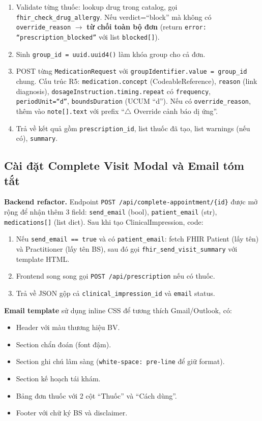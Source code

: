 \documentclass[a4paper,13pt,3p,twoside,openany]{report}
\theoremstyle{definition}
\theoremstyle{remark}
\theoremstyle{definition}
\let\ORIGsubsection\subsection
\renewcommand{\subsection}{\needspace{3\baselineskip}\ORIGsubsection}
\begin{document}
\begin{enumerate}
  \item Validate từng thuốc: lookup drug trong catalog, gọi \texttt{fhir\_check\_drug\_allergy}. Nếu verdict=``block'' mà không có \texttt{override\_reason} $\to$ \textbf{từ chối toàn bộ đơn} (return \texttt{error: ``prescription\_blocked''} với list \texttt{blocked[]}).
  \item Sinh \texttt{group\_id = uuid.uuid4()} làm khóa group cho cả đơn.
  \item POST từng \texttt{MedicationRequest} với \texttt{groupIdentifier.value = group\_id} chung. Cấu trúc R5: \texttt{medication.concept} (CodeableReference), \texttt{reason} (link diagnosis), \texttt{dosageInstruction.timing.repeat} có \texttt{frequency}, \texttt{periodUnit=``d''}, \texttt{boundsDuration} (UCUM ``d''). Nếu có \texttt{override\_reason}, thêm vào \texttt{note[].text} với prefix ``$\triangle$ Override cảnh báo dị ứng''.
  \item Trả về kết quả gồm \texttt{prescription\_id}, list thuốc đã tạo, list warnings (nếu có), \texttt{summary}.
\end{enumerate}

\subsection{Cài đặt Complete Visit Modal và Email tóm tắt}

\textbf{Backend refactor.} Endpoint \texttt{POST /api/complete-appointment/\{id\}} được mở rộng để nhận thêm 3 field: \texttt{send\_email} (bool), \texttt{patient\_email} (str), \texttt{medications[]} (list dict). Sau khi tạo ClinicalImpression, code:
\begin{enumerate}
  \item Nếu \texttt{send\_email == true} và có \texttt{patient\_email}: fetch FHIR Patient (lấy tên) và Practitioner (lấy tên BS), sau đó gọi \texttt{fhir\_send\_visit\_summary} với template HTML.
  \item Frontend song song gọi \texttt{POST /api/prescription} nếu có thuốc.
  \item Trả về JSON gộp cả \texttt{clinical\_impression\_id} và \texttt{email} status.
\end{enumerate}

\textbf{Email template} sử dụng inline CSS để tương thích Gmail/Outlook, có:
\begin{itemize}
  \item Header với màu thương hiệu BV.
  \item Section chẩn đoán (font đậm).
  \item Section ghi chú lâm sàng (\texttt{white-space: pre-line} để giữ format).
  \item Section kế hoạch tái khám.
  \item Bảng đơn thuốc với 2 cột ``Thuốc'' và ``Cách dùng''.
  \item Footer với chữ ký BS và disclaimer.
\end{itemize}
\end{document}
